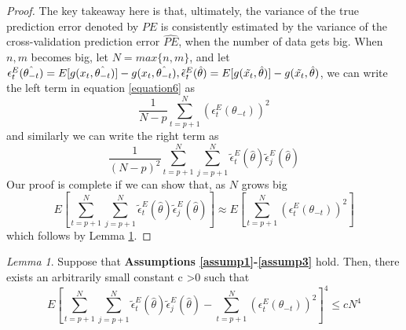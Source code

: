 \documentclass[12pt, oneside]{amsart}
\theoremstyle{definition}
\theoremstyle{remark}
\numberwithin{equation}{section}
\begin{document}
\begin{proof}
The key takeaway here is that, ultimately, the variance of the true prediction error denoted by $PE$ is consistently estimated by the variance of the cross-validation prediction error $\hat{PE}$, when the number of data gets big. When $n, m$ becomes big, let $N = max \{n, m\}$, and let $\epsilon^E_t(\hat{\theta_{-t}}) = E[g(x_t, \hat{\theta_{-t}})] - g(x_t,\hat{\theta_{-t}}), \tilde{\epsilon}^E_t(
\hat{\theta}
) = E[g(\Tilde{x_t}, \hat{\theta})] - g(\Tilde{x_t},\hat{\theta})$, we can write the left term in equation \ref{equation6} as
$$  \frac{1}{N-p} \sum_{t=p+1}^N  \left( \epsilon^E_t(\theta_{-t}) \right)^2$$and similarly we can write the right term as $$  \frac{1}{(N-p)^2} \sum_{t=p+1}^N \sum_{j=p+1}^N  \tilde{\epsilon}^E_t(\hat{\theta}) \tilde{\epsilon}^E_j(\hat{\theta})$$
Our proof is complete if we can show that, as $N$ grows big
$$E\left[ \sum_{t=p+1}^N \sum_{j=p+1}^N  \tilde{\epsilon}^E_t(\hat{\theta}) \tilde{\epsilon}^E_j(\hat{\theta}) \right]  \approx E\left[\sum_{t=p+1}^N  \left( \epsilon^E_t(\theta_{-t}) \right)^2 \right]  $$ 
which follows by Lemma \ref{lemma1}. 
\end{proof}

\newtheorem{lemma}{Lemma}
\begin{lemma}\label{lemma1}
    Suppose that \textbf{Assumptions \ref{assump1}-\ref{assump3}} hold. Then, there exists an arbitrarily small constant c \textgreater 0 such that $$E \left[  \sum_{t=p+1}^N \sum_{j=p+1}^N   \tilde{\epsilon}^E_t(\hat{\theta}) \tilde{\epsilon}^E_j(\hat{\theta}) - \sum_{t=p+1}^N  \left( \epsilon^E_t(\theta_{-t}) \right)^2 \right]^4 \leq cN^4$$
\end{lemma}
\end{document}
